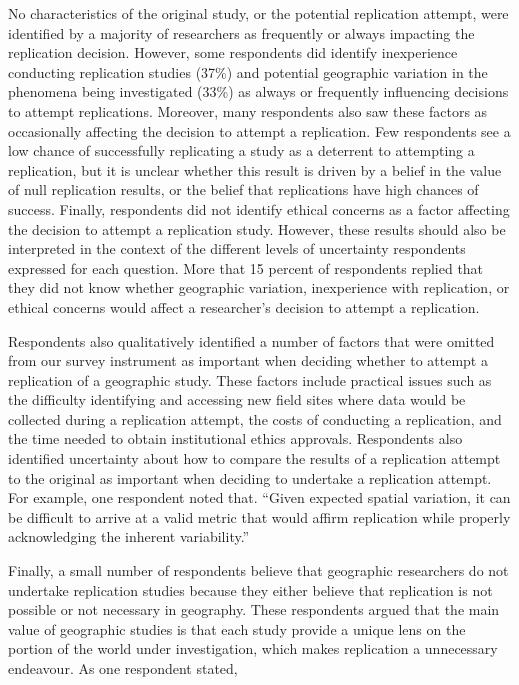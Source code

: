 \documentclass[]{interact}
\theoremstyle{plain}%
\theoremstyle{definition}
\theoremstyle{remark}
\begin{document}
No characteristics of the original study, or the potential replication attempt, were identified by a majority of researchers as frequently or always impacting the replication decision. 
However, some respondents did identify inexperience conducting replication studies (37\%) and potential geographic variation in the phenomena being investigated (33\%) as always or frequently influencing decisions to attempt replications. 
Moreover, many respondents also saw these factors as occasionally affecting the decision to attempt a replication.
Few respondents see a low chance of successfully replicating a study as a deterrent to attempting a replication, but it is unclear whether this result is driven by a belief in the value of null replication results, or the belief that replications have high chances of success.
Finally, respondents did not identify ethical concerns as a factor affecting the decision to attempt a replication study. 
However, these results should also be interpreted in the context of the different levels of uncertainty respondents expressed for each question. 
More that 15 percent of respondents replied that they did not know whether geographic variation, inexperience with replication, or ethical concerns would affect a researcher's decision to attempt a replication. 

Respondents also qualitatively identified a number of factors that were omitted from our survey instrument as important when deciding whether to attempt a replication of a geographic study. 
These factors include practical issues such as the difficulty identifying and accessing new field sites where data would be collected during a replication attempt, the costs of conducting a replication, and the time needed to obtain institutional ethics approvals.
Respondents also identified uncertainty about how to compare the results of a replication attempt to the original as important when deciding to undertake a replication attempt. 
For example, one respondent noted that. ``Given expected spatial variation, it can be difficult to arrive at a valid metric that would affirm replication while properly acknowledging the inherent variability.''

Finally, a small number of respondents believe that geographic researchers do not undertake replication studies because they either believe that replication is not possible or not necessary in geography. 
These respondents argued that the main value of geographic studies is that each study provide a unique lens on the portion of the world under investigation, which makes replication a unnecessary endeavour. 
As one respondent stated, 
\end{document}
